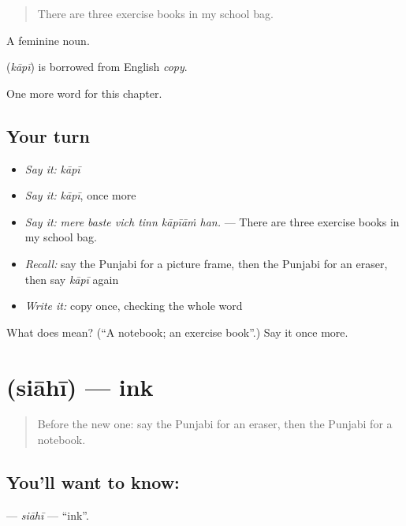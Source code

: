 \begin{quote}
There are three exercise books in my school bag.
\end{quote}

A feminine noun.

\begin{cousinweb}
\textbf{} (\emph{kāpī}) is borrowed from English \emph{copy}.
\end{cousinweb}

\begin{grammarlens}[title={What you've built}]
One more word for this chapter.
\end{grammarlens}

\subsection*{Your turn}
\begin{itemize}
\raggedright
  \item \emph{Say it:} \emph{kāpī}
  \item \emph{Say it:} \emph{kāpī}, once more
  \item \emph{Say it:} \emph{mere baste vich tinn kāpīāṁ han.} — There are three exercise books in my school bag.
  \item \emph{Recall:} say the Punjabi for a picture frame, then the Punjabi for an eraser, then say \emph{kāpī} again
  \item \emph{Write it:} copy \textbf{} once, checking the whole word
\end{itemize}

\begin{tcolorbox}[breakable,colback=teal!4,colframe=teal!35!black,title={Before you move on}]
What does  mean? (\textquotedblleft{}A notebook; an exercise book\textquotedblright{}.) Say it once more.
\end{tcolorbox}
\section[\texorpdfstring{\pa{ਸਿਆਹੀ} (siāhī)}{ਸਿਆਹੀ (siāhī)}]{ (siāhī) — ink}

\label{lesson:PA-C357-siahi}



\begin{quote}
Before the new one: say the Punjabi for an eraser, then the Punjabi for a notebook.
\end{quote}

\subsection*{You'll want to know: }
\textbf{} — \emph{siāhī} — \textquotedblleft{}ink\textquotedblright{}.


